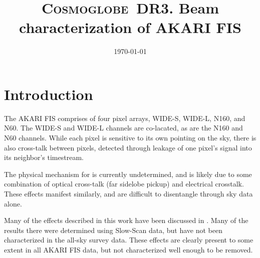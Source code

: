 \documentclass{aa}
\def\Cosmoglobe{\textsc{Cosmoglobe}}
\begin{document}
 

   \title{\bfseries{\Cosmoglobe\ DR3. Beam characterization of AKARI FIS}}

   

   \titlerunning{\Cosmoglobe: AKARI Crosstalk}

   \date{\today} 
   

   \maketitle

\setcounter{tocdepth}{2}
\tableofcontents
   
\section{Introduction}

The AKARI FIS comprises of four pixel arrays, WIDE-S, WIDE-L, N160, and N60. The WIDE-S and WIDE-L channels are co-lacated, as are the N160 and N60 channels. While each pixel is sensitive to its own pointing on the sky, there is also cross-talk between pixels, detected through leakage of one pixel's signal into its neighbor's timestream.

The physical mechanism for is currently undetermined, and is likely due to some combination of optical cross-talk (far sidelobe pickup) and electrical crosstalk. These effects manifest similarly, and are difficult to disentangle through sky data alone. 

Many of the effects described in this work have been discussed in \citet{verdugo_akari_2007}. Many of the results there were determined using Slow-Scan data, but have not been characterized in the all-sky survey data. These effects are clearly present to some extent in all AKARI FIS data, but not characterized well enough to be removed.
\end{document}
